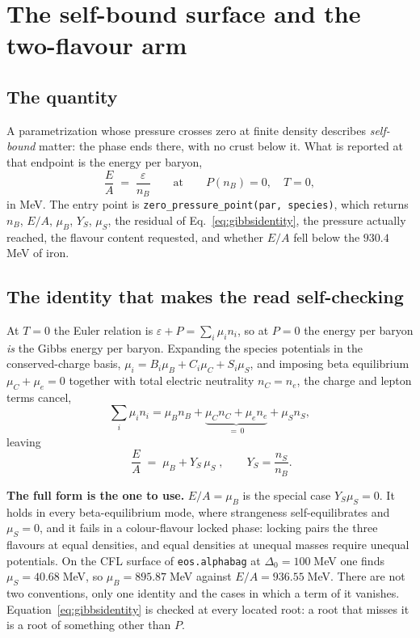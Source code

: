 \documentclass[aps,prc,onecolumn,superscriptaddress,nofootinbib,10pt]{revtex4-2}
\begin{document}
\section{The self-bound surface and the two-flavour arm}
\label{sec:zeropressure}

\subsection{The quantity}

A parametrization whose pressure crosses zero at finite density describes
\emph{self-bound} matter: the phase ends there, with no crust below it. What is
reported at that endpoint is the energy per baryon,
%
\begin{equation}
  \frac{E}{A} \;=\; \frac{\varepsilon}{n_B}
  \qquad\text{at}\qquad P(n_B) = 0,\quad T = 0 ,
\end{equation}
%
in MeV. The entry point is \texttt{zero\_pressure\_point(par, species)}, which
returns $n_B$, $E/A$, $\mu_B$, $Y_S$, $\mu_S$, the residual of
Eq.~\eqref{eq:gibbsidentity}, the pressure actually reached, the flavour
content requested, and whether $E/A$ fell below the $930.4\;$MeV of iron.

\subsection{The identity that makes the read self-checking}

At $T = 0$ the Euler relation is $\varepsilon + P = \sum_i \mu_i n_i$, so at
$P = 0$ the energy per baryon \emph{is} the Gibbs energy per baryon. Expanding
the species potentials in the conserved-charge basis,
$\mu_i = B_i\mu_B + C_i\mu_C + S_i\mu_S$, and imposing beta equilibrium
$\mu_C + \mu_e = 0$ together with total electric neutrality $n_C = n_e$, the
charge and lepton terms cancel,
%
\begin{equation}
  \sum_i \mu_i n_i
    = \mu_B n_B + \underbrace{\mu_C n_C + \mu_e n_e}_{=\,0} + \mu_S n_S ,
\end{equation}
%
leaving
%
\begin{equation}
  \boxed{\;\frac{E}{A} \;=\; \mu_B + Y_S\,\mu_S\;} ,
  \qquad Y_S = \frac{n_S}{n_B} .
  \label{eq:gibbsidentity}
\end{equation}

\textbf{The full form is the one to use.} $E/A = \mu_B$ is the special case
$Y_S\mu_S = 0$. It holds in every beta-equilibrium mode, where strangeness
self-equilibrates and $\mu_S = 0$, and it fails in a colour-flavour locked
phase: locking pairs the three flavours at equal densities, and equal densities
at unequal masses require unequal potentials. On the CFL surface of
\texttt{eos.alphabag} at $\Delta_0 = 100\;$MeV one finds
$\mu_S = 40.68\;$MeV, so $\mu_B = 895.87\;$MeV against
$E/A = 936.55\;$MeV. There are not two conventions, only one identity and the
cases in which a term of it vanishes. Equation~\eqref{eq:gibbsidentity} is
checked at every located root: a root that misses it is a root of something
other than $P$.
\end{document}

